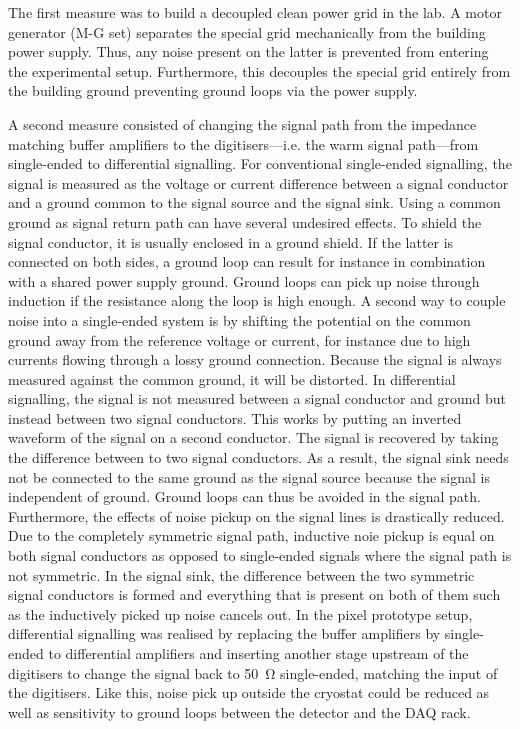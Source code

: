 The first measure was to build a decoupled clean power grid in the lab.
A motor generator (M-G set) separates the special grid mechanically from the building power supply.
Thus, any noise present on the latter is prevented from entering the experimental setup.
Furthermore, this decouples the special grid entirely from the building ground preventing ground loops via the power supply.

A second measure consisted of changing the signal path from the impedance matching buffer amplifiers to the digitisers---i.e. the warm signal path---from single-ended to differential signalling.
For conventional single-ended signalling, the signal is measured as the voltage or current difference between a signal conductor and a ground common to the signal source and the signal sink.
Using a common ground as signal return path can have several undesired effects.
To shield the signal conductor, it is usually enclosed in a ground shield.
If the latter is connected on both sides, a ground loop can result for instance in combination with a shared power supply ground.
Ground loops can pick up noise through induction if the resistance along the loop is high enough.
A second way to couple noise into a single-ended system is by shifting the potential on the common ground away from the reference voltage or current, for instance due to high currents flowing through a lossy ground connection.
Because the signal is always measured against the common ground, it will be distorted.
In differential signalling, the signal is not measured between a signal conductor and ground but instead between two signal conductors.
This works by putting an inverted waveform of the signal on a second conductor.
The signal is recovered by taking the difference between to two signal conductors.
As a result, the signal sink needs not be connected to the same ground as the signal source because the signal is independent of ground.
Ground loops can thus be avoided in the signal path.
Furthermore, the effects of noise pickup on the signal lines is drastically reduced.
Due to the completely symmetric signal path, inductive noie pickup is equal on both signal conductors as opposed to single-ended signals where the signal path is not symmetric.
In the signal sink, the difference between the two symmetric signal conductors is formed and everything that is present on both of them such as the inductively picked up noise cancels out.
In the pixel prototype setup, differential signalling was realised by replacing the buffer amplifiers by single-ended to differential amplifiers and inserting another stage upstream of the digitisers to change the signal back to \SI{50}{\ohm} single-ended, matching the input of the digitisers.
Like this, noise pick up outside the cryostat could be reduced as well as sensitivity to ground loops between the detector and the DAQ rack.

